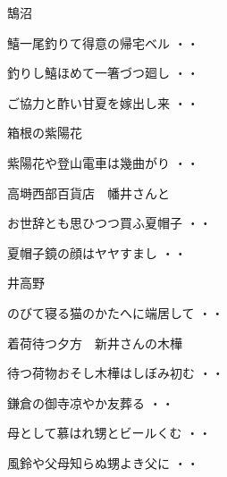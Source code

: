 \vspace{0.6cm}
鵠沼
\begin{shiika}鱚一尾釣りて得意の帰宅ベル
\hfill{・・}\end{shiika}
\begin{shiika}釣りし鱚ほめて一箸づつ廻し
\hfill{・・}\end{shiika}
\begin{shiika}ご協力と酢い甘夏を嫁出し来
\hfill{・・}\end{shiika}
\vspace{0.6cm}
箱根の紫陽花
\begin{shiika}紫陽花や登山電車は幾曲がり
\hfill{・・}\end{shiika}
\vspace{0.6cm}
高塒西部百貨店　幡井さんと
\begin{shiika}お世辞とも思ひつつ買ふ夏帽子
\hfill{・・}\end{shiika}
\vspace{0.6cm}
\begin{shiika}夏帽子鏡の顔はヤヤすまし
\hfill{・・}\end{shiika}
\vspace{0.6cm}
井高野
\begin{shiika}のびて寝る猫のかたへに端居して
\hfill{・・}\end{shiika}
\vspace{0.6cm}
着荷待つ夕方　新井さんの木樺
\begin{shiika}待つ荷物おそし木樺はしぼみ初む
\hfill{・・}\end{shiika}
\vspace{0.6cm}
\begin{shiika}鎌倉の御寺凉やか友葬る
\hfill{・・}\end{shiika}
\vspace{0.6cm}
\begin{shiika}母として慕はれ甥とビールくむ
\hfill{・・}\end{shiika}
\vspace{0.6cm}
\begin{shiika}風鈴や父母知らぬ甥よき父に
\hfill{・・}\end{shiika}
\vspace{0.6cm}
